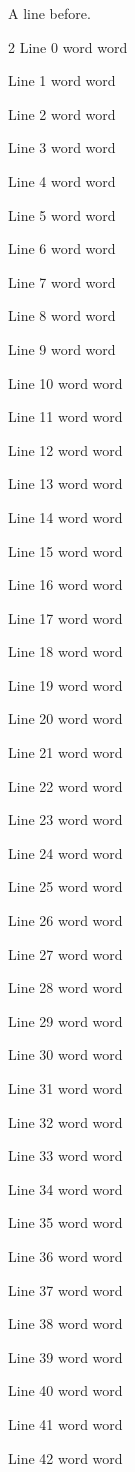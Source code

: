 \documentclass{article}
\begin{document}
A line before.

\begin{multicols}{2}
Line 0 word word

Line 1 word word

Line 2 word word

Line 3 word word

Line 4 word word

Line 5 word word

Line 6 word word

Line 7 word word

Line 8 word word

Line 9 word word

Line 10 word word

Line 11 word word

Line 12 word word

Line 13 word word

Line 14 word word

Line 15 word word

Line 16 word word

Line 17 word word

Line 18 word word

Line 19 word word

Line 20 word word

Line 21 word word

Line 22 word word

Line 23 word word

Line 24 word word

Line 25 word word

Line 26 word word

Line 27 word word

Line 28 word word

Line 29 word word

Line 30 word word

Line 31 word word

Line 32 word word

Line 33 word word

Line 34 word word

Line 35 word word

Line 36 word word

Line 37 word word

Line 38 word word

Line 39 word word

Line 40 word word

Line 41 word word

Line 42 word word


\end{multicols}
\end{document}
